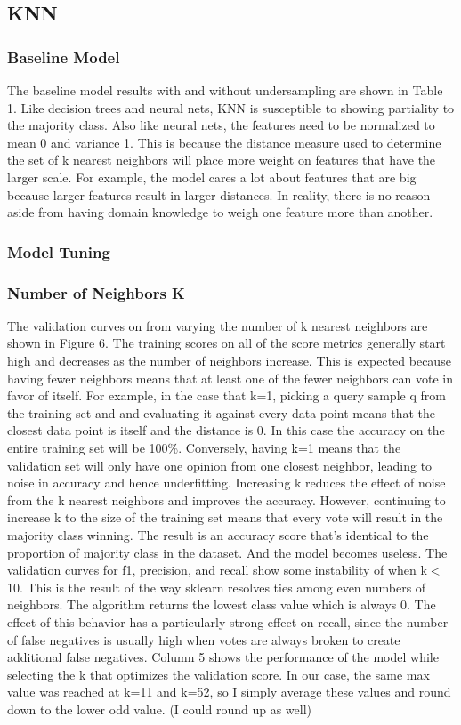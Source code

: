 \documentclass{article}
\begin{document}
\subsection{KNN}
\subsubsection*{Baseline Model}

The baseline model results with and without undersampling are shown in Table 1. Like decision trees and neural nets, KNN is susceptible to showing partiality to the majority class. Also like neural nets, the features need to be normalized to mean 0 and variance 1. This is because the distance measure used to determine the set of k nearest neighbors will place more weight on features that have the larger scale. For example, the model cares a lot about features that are big because larger features result in larger distances. In reality, there is no reason aside from having domain knowledge to weigh one feature more than another. 


\subsubsection*{Model Tuning}
\subsubsection*{Number of Neighbors K}

The validation curves on from varying the number of k nearest neighbors are shown in Figure 6. The training scores on all of the score metrics generally start high and decreases as the number of neighbors increase. This is expected because having fewer neighbors means that at least one of the fewer neighbors can vote in favor of itself. For example, in the case that k=1, picking a query sample q from the training set and and evaluating it against every data point means that the closest data point is itself and the distance is 0. In this case the accuracy on the entire training set will be 100\%. Conversely, having k=1 means that the validation set will only have one opinion from one closest neighbor, leading to noise in accuracy and hence underfitting. Increasing k reduces the effect of noise from the k nearest neighbors and improves the accuracy. However, continuing to increase k to the size of the training set means that every vote will result in the majority class winning. The result is an accuracy score that's identical to the proportion of majority class in the dataset. And the model becomes useless. The validation curves for f1, precision, and recall show some instability of when k$<$10. This is the result of the way sklearn resolves ties among even numbers of neighbors. The algorithm returns the lowest class value which is always 0. The effect of this behavior has a particularly strong effect on recall, since the number of false negatives is usually high when votes are always broken to create additional false negatives. Column 5 shows the performance of the model while selecting the k that optimizes the validation score. In our case, the same max value was reached at k=11 and k=52, so I simply average these values and round down to the lower odd value. (I could round up as well)
\end{document}
